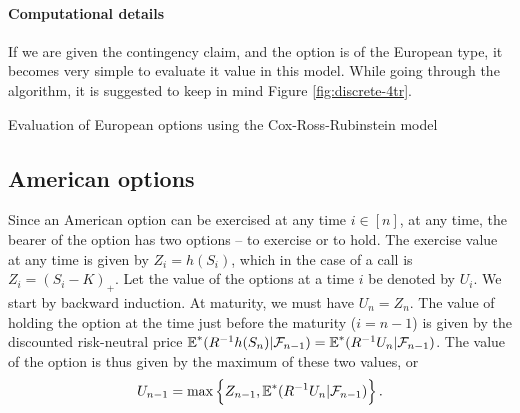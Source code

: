 \paragraph{Computational details}
If we are given the contingency claim, and the option is of the European type, it becomes very simple to evaluate it value in this model. While going through the algorithm, it is suggested to keep in mind Figure \ref{fig:discrete-4tr}.

\begin{algorithm}[H]
	\DontPrintSemicolon
	
	
	
	
	\caption{Evaluation of European options using the Cox-Ross-Rubinstein model}
	\label{alg:discrete-eu}
\end{algorithm}



\subsection{American options}

Since an American option can be exercised at any time $ i \in [n] $, at any time, the bearer of the option has two options -- to exercise or to hold. The exercise value at any time is given by $ Z_i = h(S_i) $, which in the case of a call is $ Z_i = (S_i - K)_+ $. Let the value of the options at a time $ i $ be denoted by $ U_i $. We start by backward induction. At maturity, we must have $ U_n = Z_n $. The value of holding the option at the time just before the maturity ($ i = n-1 $) is given by the discounted risk-neutral price $ \operatorname{\mathbb{E}}^*( R^{-1} h(S_n) | \mathcal{F}_{n-1} ) = \operatorname{\mathbb{E}}^*( R^{-1} U_n | \mathcal{F}_{n-1} ) $. The value of the option is thus given by the maximum of these two values, or
\begin{equation}
	U_{n-1} = \max \left\lbrace Z_{n-1}, \operatorname{\mathbb{E}}^*( R^{-1} U_n | \mathcal{F}_{n-1} ) \right\rbrace .
\end{equation}

